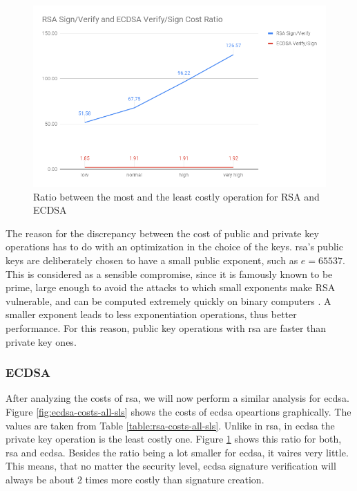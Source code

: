\documentclass{llncs}
\begin{document}
\begin{figure}
  \centering
  \includegraphics[width=1.0\textwidth]{img/rsa_ecdsa_operation_ratio.png}
  \caption{\label{fig:rsa-ecdsa-pub-priv-ratio} Ratio between the most and the least costly operation for RSA and ECDSA}
\end{figure}

The reason for the discrepancy between the cost of public and private key operations has to do with an optimization
in the choice of the keys. \gls{rsa}'s public keys are deliberately chosen to have a small public exponent, such as $e=65537$. This is considered as a
sensible compromise, since it is famously known to be prime, large enough to avoid the attacks to which 
small exponents make RSA vulnerable, and can be computed extremely quickly on binary computers \cite{boneh2002fast}\cite{muir2006seifert}.
A smaller exponent leads to less exponentiation operations, thus better performance. For this reason, public
key operations with \gls{rsa} are faster than private key ones.

\subsubsection{ECDSA}

After analyzing the costs of \gls{rsa}, we will now perform a similar analysis for \gls{ecdsa}. Figure \ref{fig:ecdsa-costs-all-sls}
shows the costs of \gls{ecdsa} opeartions graphically. The values are taken from Table \ref{table:rsa-costs-all-sls}. Unlike in \gls{rsa}, 
in \gls{ecdsa} the private key operation is the least costly one. Figure \ref{fig:rsa-ecdsa-pub-priv-ratio} shows this ratio for both, 
\gls{rsa} and \gls{ecdsa}. Besides the ratio being a lot smaller for \gls{ecdsa}, it vaires very little. This means, that no matter
the security level, \gls{ecdsa} signature verification will always be about $2$ times more costly than signature creation.
\end{document}
